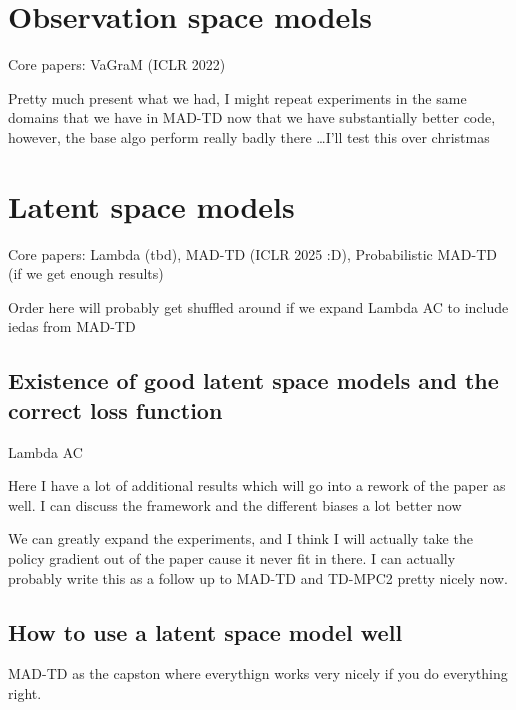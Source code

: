 \section{Observation space models}
Core papers:
VaGraM (ICLR 2022)

Pretty much present what we had, I might repeat experiments in the same domains that we have in MAD-TD now that we have substantially better code, however, the base algo perform really badly there \dots I'll test this over christmas

\section{Latent space models}
Core papers:
Lambda (tbd), MAD-TD (ICLR 2025 :D), Probabilistic MAD-TD (if we get enough results)

Order here will probably get shuffled around if we expand Lambda AC to include iedas from MAD-TD

\subsection{Existence of good latent space models and the correct loss function}

Lambda AC

Here I have a lot of additional results which will go into a rework of the paper as well.
I can discuss the framework and the different biases a lot better now

We can greatly expand the experiments, and I think I will actually take the policy gradient out of the paper cause it never fit in there. 
I can actually probably write this as a follow up to MAD-TD and TD-MPC2 pretty nicely now.

\subsection{How to use a latent space model well}
MAD-TD as the capston where everythign works very nicely if you do everything right.
